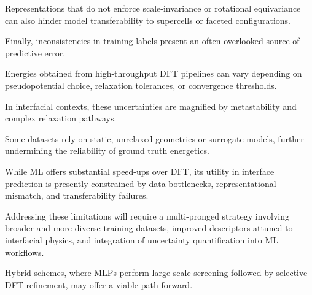 Representations that do not enforce scale-invariance or rotational equivariance can also hinder model transferability to
supercells or faceted configurations.


Finally, inconsistencies in training labels present an often-overlooked source of predictive error.

Energies obtained from high-throughput DFT pipelines can vary depending on pseudopotential choice, relaxation
tolerances, or convergence thresholds.

In interfacial contexts, these uncertainties are magnified by metastability and complex relaxation pathways.

Some datasets rely on static, unrelaxed geometries or surrogate models, further undermining the reliability of ground
truth energetics.


While ML offers substantial speed-ups over DFT, its utility in interface prediction is presently constrained by data
bottlenecks, representational mismatch, and transferability failures.

Addressing these limitations will require a multi-pronged strategy involving broader and more diverse training datasets,
improved descriptors attuned to interfacial physics, and integration of uncertainty quantification into ML workflows.

Hybrid schemes, where MLPs perform large-scale screening followed by selective DFT refinement, may offer a viable path
forward.
